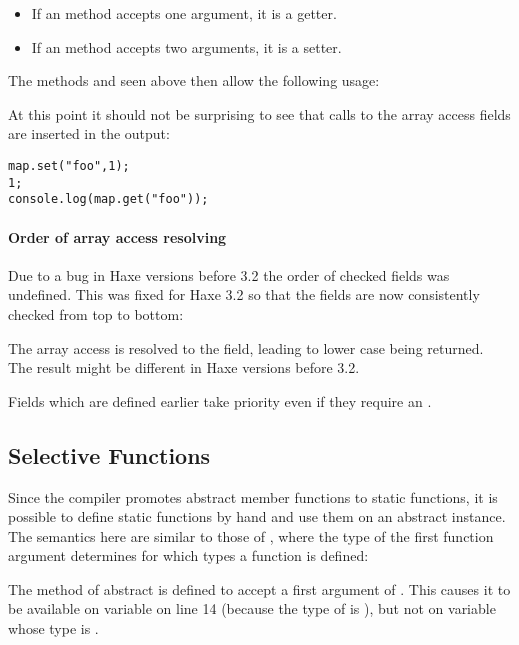 {\begin{itemize}
	\item If an  method accepts one argument, it is a getter.
	\item If an  method accepts two arguments, it is a setter.
\end{itemize}
The methods  and  seen above then allow the following usage:


At this point it should not be surprising to see that calls to the array access fields are inserted in the output:

\begin{lstlisting}
map.set("foo",1);
1;
console.log(map.get("foo"));
\end{lstlisting}

\paragraph{Order of array access resolving}
\label{types-abstract-array-access-order}

Due to a bug in Haxe versions before 3.2 the order of checked  fields was undefined. This was fixed for Haxe 3.2 so that the fields are now consistently checked from top to bottom:


The array access  is resolved to the  field, leading to lower case  being returned. The result might be different in Haxe versions before 3.2.

Fields which are defined earlier take priority even if they require an .


\subsection{Selective Functions}
\label{types-abstract-selective-functions}

Since the compiler promotes abstract member functions to static functions, it is possible to define static functions by hand and use them on an abstract instance. The semantics here are similar to those of , where the type of the first function argument determines for which types a function is defined:

The method  of abstract  is defined to accept a first argument of . This causes it to be available on variable  on line 14 (because the type of  is ), but not on variable  whose type is .

}
